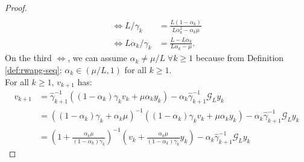 \documentclass[12pt]{article}
\begin{document}
\begin{proof}
\begin{align*}
                \\
                \iff 
                L/\gamma_k
                &= 
                \frac{L (1 - \alpha_k)}{L \alpha_k^2 - \alpha_k\mu}
                \\
                \iff 
                L\alpha_k/\gamma_k
                &= 
                \frac{L - L\alpha_k}{L\alpha_k - \mu}. 
            \end{align*}
            On the third $\iff$, we can assume $\alpha_k \neq \mu/L\;  \forall k \ge 1$ because from Definition \ref{def:rwapg-seq}: $\alpha_k \in (\mu/L, 1)$ for all $k \ge 1$. 
            \\
            For all $k \ge 1$, $v_{k + 1}$ has: 
            \begin{align*}
                v_{k + 1} &= 
                \hat \gamma_{k + 1}^{-1}
                ((1 - \alpha_k)\gamma_k v_k + \mu\alpha_k y_k)
                - \alpha_k\hat \gamma_{k + 1}^{-1}\mathcal G_L y_k
                \\
                &= 
                ((1 - \alpha_k)\gamma_k + \alpha_k \mu)^{-1}
                \left(
                    (1 - \alpha_k)\gamma_k v_k + \mu\alpha_k y_k
                \right)
                - \alpha_k\hat \gamma_{k + 1}^{-1}\mathcal G_L y_k
                \\
                &= 
                \left(
                    1 + \frac{\alpha_k\mu}{(1 - \alpha_k)\gamma_k}
                \right)^{-1}
                \left(
                    v_k + 
                    \frac{\alpha_k\mu}{(1 - \alpha_k)\gamma_k} y_k
                \right)
                - \alpha_k\hat \gamma_{k + 1}^{-1}\mathcal G_L y_k

\end{align*}
\end{proof}
\end{document}
